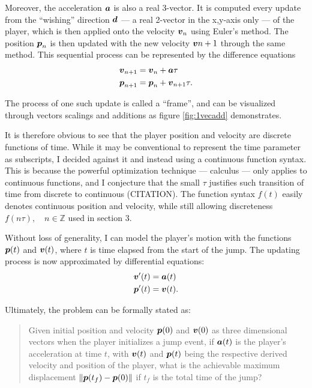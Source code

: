 Moreover, the acceleration $\boldsymbol{a}$ is also a real 3-vector. It is computed every update from the ``wishing'' direction $\boldsymbol{d}$ --- a real 2-vector in the x,y-axis only --- of the player, which is then applied onto the velocity $\boldsymbol{v}_n$ using Euler's method. The position $\boldsymbol{p}_n$ is then updated with the new velocity $\boldsymbol{v}{n+1}$ through the same method. This sequential process can be represented by the difference equations
\begin{align}
    \boldsymbol{v}_{n+1} &= \boldsymbol{v}_n + \boldsymbol{a} \tau\\
    \boldsymbol{p}_{n+1} &= \boldsymbol{p}_n + \boldsymbol{v}_{n+1} \tau.
\end{align}

The process of one such update is called a ``frame'', and can be visualized through vectors scalings and additions as figure \ref{fig:1vecadd} demonstrates.

It is therefore obvious to see that the player position and velocity are discrete functions of time. While it may be conventional to represent the time parameter as subscripts, I decided against it and instead using a continuous function syntax. This is because the powerful optimization technique --- calculus --- only applies to continuous functions, and I conjecture that the small $\tau$ justifies such transition of time from discrete to continuous (CITATION). The function syntax $f(t)$ easily denotes continuous position and velocity, while still allowing discreteness $f(n\tau), \quad n\in\mathbb{Z}$ used in section 3.

Without loss of generality, I can model the player's motion with the functions $\boldsymbol{p}(t)$ and $\boldsymbol{v}(t)$, where $t$ is time elapsed from the start of the jump. The updating process is now approximated by differential equations:
\begin{align}
    \boldsymbol{v}'(t) &= \boldsymbol{a}(t) \label{eq:1de1}\\
    \boldsymbol{p}'(t) &= \boldsymbol{v}(t) \label{eq:1de2}.
\end{align}

Ultimately, the problem can be formally stated as:
\begin{quote}
    Given initial position and velocity $\boldsymbol{p}(0)$ and $\boldsymbol{v}(0)$ as three dimensional vectors when the player initializes a jump event, if $\boldsymbol{a}(t)$ is the player's acceleration at time $t$, with $\boldsymbol{v}(t)$ and $\boldsymbol{p}(t)$ being the respective derived velocity and position of the player, what is the achievable maximum displacement $\|\boldsymbol{p}(t_f) - \boldsymbol{p}(0)\|$ if $t_f$ is the total time of the jump?
\end{quote}

